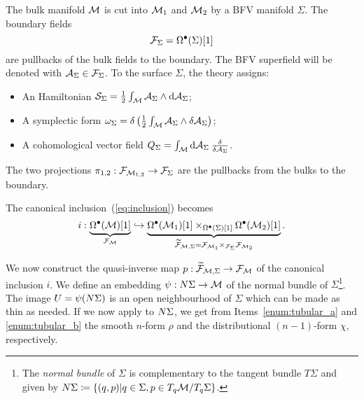 The bulk manifold $\mathcal{M}$ is cut into $\mathcal{M}_1$ and $\mathcal{M}_2$ by a BFV manifold $\Sigma$.
The boundary fields
\begin{equation*}
    \mathcal{F}_\Sigma = \Omega^\bullet (\Sigma)[1]
\end{equation*}
are pullbacks of the bulk fields to the boundary. The BFV superfield will be denoted with $\mathcal{A}_\Sigma \in \mathcal{F}_\Sigma$.
To the surface $\Sigma$, the theory assigns:
\begin{itemize} %
    \item An Hamiltonian $\mathcal{S}_\Sigma = \frac{1}{2}\int_{\mathcal{M}} \mathcal{A}_\Sigma \wedge \dd \mathcal{A}_\Sigma$;
    \item A symplectic form $\omega_\Sigma = \delta \left( \frac{1}{2} \int_{\mathcal{M}} \mathcal{A}_\Sigma \wedge \delta \mathcal{A}_\Sigma \right)$;
    \item A cohomological vector field $Q_\Sigma = \int_{\mathcal{M}} \dd \mathcal{A}_\Sigma \: \frac{\delta}{\delta \mathcal{A}_\Sigma}$.
\end{itemize}

The two projections $\pi_{1,2} : \mathcal{F}_{\mathcal{M}_{1,2}} \rightarrow \mathcal{F}_\Sigma$ are the pullbacks from the bulks to the boundary.

The canonical inclusion~(\ref{eq:inclusion}) becomes
\begin{equation*}
    i : \underbrace{\Omega^\bullet (\mathcal{M})[1]}_{\mathcal{F}_{\mathcal{M}}} \hookrightarrow 
    \underbrace{\Omega^\bullet (\mathcal{M}_1)[1] \times_{\Omega^\bullet (\Sigma)[1]} \Omega^\bullet (\mathcal{M}_2)[1]}_{\widetilde{\mathcal{F}}_{\mathcal{M}, \Sigma} = \mathcal{F}_{\mathcal{M}_1} \times_{\mathcal{F}_\Sigma} \mathcal{F}_{\mathcal{M}_2}} .
\end{equation*}

We now construct the quasi-inverse map $p: \widetilde{\mathcal{F}}_{\mathcal{M}, \Sigma} \rightarrow \mathcal{F}_{\mathcal{M}}$ of the canonical inclusion $i$.
We define an embedding $\psi: N \Sigma \rightarrow \mathcal{M}$ of the normal bundle of $\Sigma$\footnote{The \emph{normal bundle} of $\Sigma$ is complementary to the tangent bundle $T\Sigma$ and given by 
$N\Sigma \coloneqq \{ (q, p) | q \in \Sigma, p \in T_q \mathcal{M} / T_q \Sigma \}$.}.
The image $U = \psi(N \Sigma)$ is an open neighbourhood of $\Sigma$ which can be made as thin as needed.
If we now apply  to $N \Sigma$, we get from Items~\ref{enum:tubular_a} and \ref{enum:tubular_b} the smooth $n$-form $\rho$ and the distributional $(n-1)$-form $\chi$, respectively.

